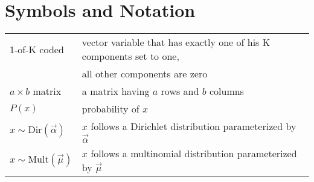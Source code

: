\section*{Symbols and Notation}

\begin{tabular}{ll}
1-of-K coded & vector variable that has exactly one of his K components set to one,\\ & all other components are zero\\
$a \times b$ matrix & a matrix having $a$ rows and $b$ columns\\
$P(x)$ & probability of $x$\\
$x \sim \text{Dir}(\vec \alpha)$ & $x$ follows a Dirichlet distribution parameterized by $\vec \alpha$\\
$x \sim \text{Mult}(\vec \mu)$ & $x$ follows a multinomial distribution parameterized by $\vec \mu$
\end{tabular}
